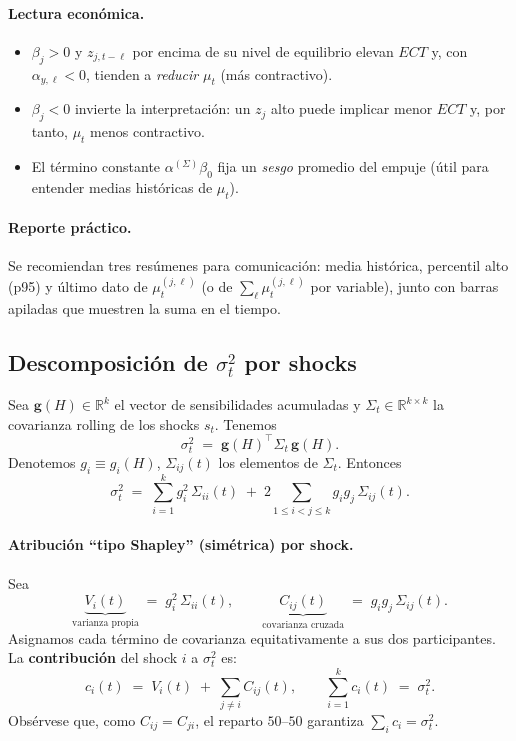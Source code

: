 \documentclass[11pt,a4paper]{article}
\newcommand{\1}{\mathbf{1}}
\newcommand{\vect}[1]{\boldsymbol{#1}}
\begin{document}
\paragraph{Lectura económica.}
\begin{itemize}
  \item \(\beta_j>0\) y \(z_{j,t-\ell}\) por encima de su nivel de equilibrio elevan \(ECT\) y, con \(\alpha_{y,\ell}<0\), tienden a \emph{reducir} \(\mu_t\) (más contractivo).
  \item \(\beta_j<0\) invierte la interpretación: un \(z_j\) alto puede implicar menor \(ECT\) y, por tanto, \(\mu_t\) menos contractivo.
  \item El término constante \(\alpha^{(\Sigma)}\beta_0\) fija un \emph{sesgo} promedio del empuje (útil para entender medias históricas de \(\mu_t\)).
\end{itemize}

\paragraph{Reporte práctico.}
Se recomiendan tres resúmenes para comunicación: media histórica, percentil alto (p95) y último dato de \(\mu_t^{(j,\ell)}\) (o de \(\sum_\ell \mu_t^{(j,\ell)}\) por variable), junto con barras apiladas que muestren la suma en el tiempo.


\subsection{Descomposición de \texorpdfstring{$\sigma_t^2$}{sigma\_t^2} por shocks}

Sea \(\vect{g}(H)\in\mathbb{R}^{k}\) el vector de sensibilidades acumuladas y \(\Sigma_t\in\mathbb{R}^{k\times k}\) la covarianza rolling de los shocks \(s_t\). Tenemos
\[
\sigma_t^2 \;=\; \vect{g}(H)^\top \Sigma_t\, \vect{g}(H).
\]
Denotemos \(g_i \equiv g_i(H)\), \(\Sigma_{ij}(t)\) los elementos de \(\Sigma_t\). Entonces
\begin{equation}
\label{eq:sigma_quad}
\sigma_t^2
\;=\;
\sum_{i=1}^{k} g_i^2\, \Sigma_{ii}(t)
\;+\;
2\sum_{1\le i<j\le k} g_i g_j\, \Sigma_{ij}(t).
\end{equation}

\paragraph{Atribución ``tipo Shapley'' (simétrica) por shock.}
Sea
\[
\underbrace{V_i(t)}_{\text{varianza propia}}
\;=\;
g_i^2\, \Sigma_{ii}(t),
\qquad
\underbrace{C_{ij}(t)}_{\text{covarianza cruzada}}
\;=\;
g_i g_j\, \Sigma_{ij}(t).
\]
Asignamos cada término de covarianza equitativamente a sus dos participantes. La \textbf{contribución} del shock \(i\) a \(\sigma_t^2\) es:
\begin{equation}
\label{eq:shapley_like}
c_i(t)
\;=\;
V_i(t)
\;+\;
\sum_{j\neq i} C_{ij}(t),
\qquad
\sum_{i=1}^{k} c_i(t) \;=\; \sigma_t^2.
\end{equation}
Obsérvese que, como \(C_{ij}=C_{ji}\), el reparto \(50\text{--}50\) garantiza \(\sum_i c_i=\sigma_t^2\).
\end{document}
